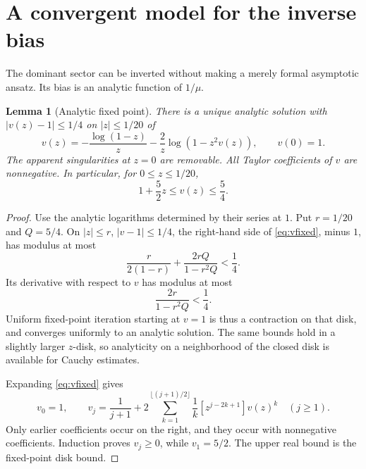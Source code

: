 \documentclass[11pt]{article}
\numberwithin{equation}{section}
\newtheorem{lemma}[theorem]{Lemma}
\theoremstyle{definition}
\theoremstyle{remark}
\newcommand{\coeff}[2]{[#1^{#2}]}
\begin{document}
\section{A convergent model for the inverse bias}\label{sec:smooth}
The dominant sector can be inverted without making a merely formal
asymptotic ansatz. Its bias is an analytic function of $1/\mu$.

\begin{lemma}[Analytic fixed point]\label{lem:v}
There is a unique analytic solution with $|v(z)-1|\le1/4$ on
$|z|\le1/20$ of
\begin{equation}\label{eq:vfixed}
 v(z)=-\frac{\log(1-z)}z
       -\frac2z\log(1-z^2v(z)),\qquad v(0)=1.
\end{equation}
The apparent singularities at $z=0$ are removable. All Taylor
coefficients of $v$ are nonnegative. In particular, for $0\le z\le1/20$,
\begin{equation}\label{eq:vrealbounds}
 1+\frac52 z\le v(z)\le\frac54.
\end{equation}
\end{lemma}
\begin{proof}
Use the analytic logarithms determined by their series at $1$. Put
$r=1/20$ and $Q=5/4$. On $|z|\le r$, $|v-1|\le1/4$, the right-hand
side of \eqref{eq:vfixed}, minus $1$, has modulus at most
\[
 \frac{r}{2(1-r)}+\frac{2rQ}{1-r^2Q}<\frac14.
\]
Its derivative with respect to $v$ has modulus at most
\[
 \frac{2r}{1-r^2Q}<\frac14.
\]
Uniform fixed-point iteration starting at $v=1$ is thus a contraction
on that disk, and converges uniformly to an analytic solution. The same
bounds hold in a slightly larger $z$-disk, so analyticity on a
neighborhood of the closed disk is available for Cauchy estimates.

Expanding \eqref{eq:vfixed} gives
\begin{equation}\label{eq:vrec}
 v_0=1,\qquad
 v_j=\frac1{j+1}
 +2\sum_{k=1}^{\lfloor(j+1)/2\rfloor}
 \frac1k\coeff{z}{j-2k+1}v(z)^k\quad(j\ge1).
\end{equation}
Only earlier coefficients occur on the right, and they occur with
nonnegative coefficients. Induction proves $v_j\ge0$, while
$v_1=5/2$. The upper real bound is the fixed-point disk bound.
\end{proof}
\end{document}
